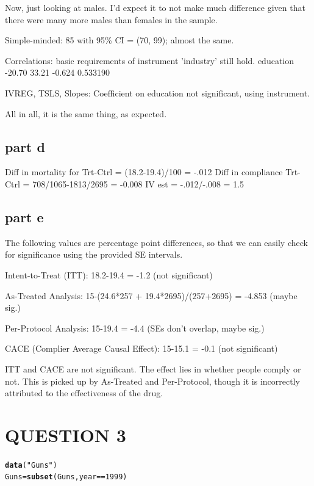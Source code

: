 \documentclass{article}\usepackage{graphicx, color}
\makeatletter
\newcommand{\hlfunctioncall}[1]{\textcolor[rgb]{0.501960784313725,0,0.329411764705882}{\textbf{#1}}}%
\newcommand{\hlstring}[1]{\textcolor[rgb]{0.6,0.6,1}{#1}}%
\newenvironment{kframe}{%
 \def\at@end@of@kframe{}%
 \ifinner\ifhmode%
  \def\at@end@of@kframe{\end{minipage}}%
  \begin{minipage}{\columnwidth}%
 \fi\fi%
 \def\FrameCommand##1{\hskip\@totalleftmargin \hskip-\fboxsep
 \colorbox{shadecolor}{##1}\hskip-\fboxsep
     \hskip-\linewidth \hskip-\@totalleftmargin \hskip\columnwidth}%
 \MakeFramed {\advance\hsize-\width
   \@totalleftmargin\z@ \linewidth\hsize
   \@setminipage}}%
 {\par\unskip\endMakeFramed%
 \at@end@of@kframe}
\newenvironment{knitrout}{}{} %
\makeatother
\begin{document}
Now, just looking at males. I'd expect it to not make much difference given that there were many more males than females in the sample.

Simple-minded: 85 with 95\% CI = (70, 99); almost the same.

Correlations: basic requirements of instrument 'industry' still hold.
education     -20.70      33.21  -0.624 0.533190    

IVREG, TSLS, Slopes: Coefficient on education not significant, using instrument.

All in all, it is the same thing, as expected.

\subsection*{part d}
Diff in mortality for Trt-Ctrl = (18.2-19.4)/100 = -.012
Diff in compliance Trt-Ctrl = 708/1065-1813/2695 = -0.008
IV est = -.012/-.008 = 1.5

\subsection*{part e}
The following values are percentage point differences, so that we can easily check for significance using the provided SE intervals.

Intent-to-Treat (ITT): 18.2-19.4 = -1.2 (not significant)

As-Treated Analysis: 15-(24.6*257 + 19.4*2695)/(257+2695) = -4.853 (maybe sig.)

Per-Protocol Analysis: 15-19.4 = -4.4 (SEs don't overlap, maybe sig.)

CACE (Complier Average Causal Effect): 15-15.1 = -0.1 (not significant)

ITT and CACE are not significant. The effect lies in whether people comply or not. This is picked up by As-Treated and Per-Protocol, though it is incorrectly attributed to the effectiveness of the drug.

\newpage
\section*{QUESTION 3}
\begin{knitrout}
\color{fgcolor}\begin{kframe}
\begin{alltt}
\hlfunctioncall{data}(\hlstring{"Guns"})
Guns=\hlfunctioncall{subset}(Guns, year == 1999)
\end{alltt}
\end{kframe}
\end{knitrout}
\end{document}
